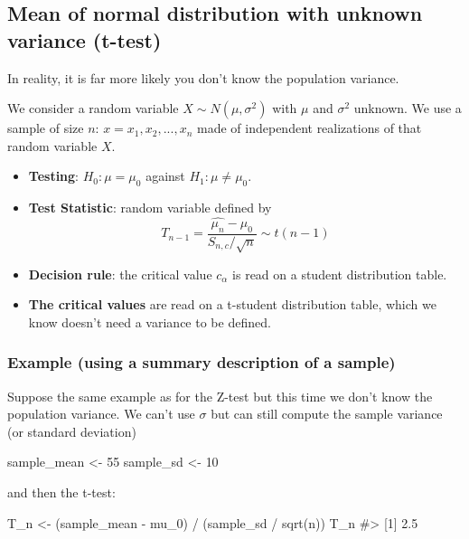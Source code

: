 \documentclass[
  letterpaper,
  DIV=11,
  numbers=noendperiod]{scrreprt}
\newenvironment{Shaded}{\begin{snugshade}}{\end{snugshade}}
\newcommand{\CommentTok}[1]{\textcolor[rgb]{0.37,0.37,0.37}{#1}}
\newcommand{\DecValTok}[1]{\textcolor[rgb]{0.68,0.00,0.00}{#1}}
\newcommand{\FunctionTok}[1]{\textcolor[rgb]{0.28,0.35,0.67}{#1}}
\newcommand{\NormalTok}[1]{\textcolor[rgb]{0.00,0.23,0.31}{#1}}
\newcommand{\OtherTok}[1]{\textcolor[rgb]{0.00,0.23,0.31}{#1}}
\newcommand{\SpecialCharTok}[1]{\textcolor[rgb]{0.37,0.37,0.37}{#1}}
\providecommand{\tightlist}{%
  \setlength{\itemsep}{0pt}\setlength{\parskip}{0pt}}\usepackage{longtable,booktabs,array}
\begin{document}
\subsection{Mean of normal distribution with unknown variance
(t-test)}\label{mean-of-normal-distribution-with-unknown-variance-t-test}

In reality, it is far more likely you don't know the population
variance.

We consider a random variable \(X \sim N(\mu, \sigma^2)\) with \(\mu\)
and \(\sigma^2\) unknown. We use a sample of size \(n\):
\(x = {x_1, x_2,..., x_n}\) made of independent realizations of that
random variable \(X\).

\begin{itemize}
\tightlist
\item
  \textbf{Testing}: \(H_0: \mu = \mu_0\) against
  \(H_1: \mu \neq \mu_0\).
\item
  \textbf{Test Statistic}: random variable defined by
  \[T_{n-1} = \dfrac{\hat{\mu_n} - \mu_0}{S_{n,c} / \sqrt{n}} \sim t(n-1)\]
\item
  \textbf{Decision rule}: the critical value \(c_\alpha\) is read on a
  student distribution table.
\item
  \textbf{The critical values} are read on a t-student distribution
  table, which we know doesn't need a variance to be defined.
\end{itemize}

\subsubsection{Example (using a summary description of a
sample)}\label{example-using-a-summary-description-of-a-sample}

Suppose the same example as for the Z-test but this time we don't know
the population variance. We can't use \(\sigma\) but can still compute
the sample variance (or standard deviation)

\begin{Shaded}
\begin{Highlighting}[]
\NormalTok{sample\_mean }\OtherTok{\textless{}{-}} \DecValTok{55}
\NormalTok{sample\_sd }\OtherTok{\textless{}{-}} \DecValTok{10}
\end{Highlighting}
\end{Shaded}

and then the t-test:

\begin{Shaded}
\begin{Highlighting}[]
\NormalTok{T\_n }\OtherTok{\textless{}{-}}\NormalTok{ (sample\_mean }\SpecialCharTok{{-}}\NormalTok{ mu\_0) }\SpecialCharTok{/}\NormalTok{ (sample\_sd }\SpecialCharTok{/} \FunctionTok{sqrt}\NormalTok{(n))}
\NormalTok{T\_n}
\CommentTok{\#\textgreater{} [1] 2.5}
\end{Highlighting}
\end{Shaded}
\end{document}
